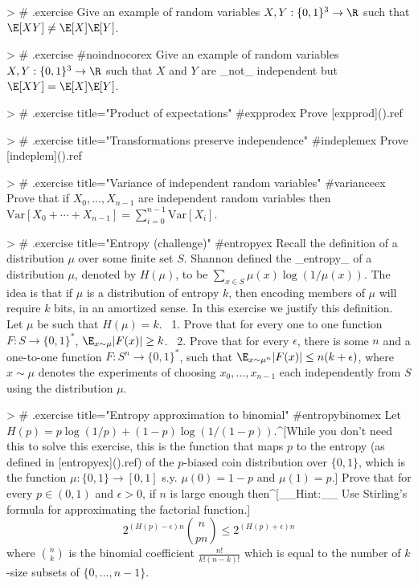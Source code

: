 > # {.exercise }
Give an example of random variables $X,Y: \{0,1\}^3 \rightarrow \R$ such that
$\E[XY] \neq \E[X]\E[Y]$.


> # {.exercise #noindnocorex }
Give an example of random variables $X,Y: \{0,1\}^3 \rightarrow \R$ such that $X$ and $Y$ are _not_ independent but $\E[XY] =\E[X]\E[Y]$.



> # {.exercise title="Product of expectations" #expprodex}
Prove [expprod](){.ref}

> # {.exercise title="Transformations preserve independence" #indeplemex}
Prove [indeplem](){.ref}


> # {.exercise title="Variance of independent random variables" #varianceex}
Prove that if $X_0,\ldots,X_{n-1}$ are independent random variables then $\mathrm{Var}[X_0+\cdots+X_{n-1}]=\sum_{i=0}^{n-1} \mathrm{Var}[X_i]$.


> # {.exercise title="Entropy (challenge)" #entropyex}
Recall the definition of a distribution $\mu$ over some finite set $S$.
Shannon defined the _entropy_ of a distribution $\mu$, denoted by $H(\mu)$, to be $\sum_{x\in S} \mu(x)\log(1/\mu(x))$.
The idea is that if $\mu$ is a distribution of entropy $k$, then encoding members of $\mu$ will require $k$ bits, in an amortized sense.
In this exercise we justify this definition. Let  $\mu$ be such that $H(\mu)=k$. \
1. Prove that for every one to one function $F:S \rightarrow \{0,1\}^*$, $\E_{x \sim \mu} |F(x)| \geq k$. \
2. Prove that  for every $\epsilon$, there is some $n$ and a one-to-one function $F:S^n \rightarrow \{0,1\}^*$, such that $\E_{x\sim \mu^n} |F(x)| \leq n(k+\epsilon)$,
where $x \sim \mu$ denotes the experiments of choosing $x_0,\ldots,x_{n-1}$ each independently from $S$ using the distribution $\mu$.

> # {.exercise title="Entropy approximation to binomial" #entropybinomex}
Let $H(p) = p \log(1/p)+(1-p)\log(1/(1-p))$.^[While you don't need this to solve this exercise, this is the function that maps $p$ to the entropy (as defined in [entropyex](){.ref}) of the $p$-biased coin distribution over $\{0,1\}$, which is the function $\mu:\{0,1\}\rightarrow [0,1]$ s.y. $\mu(0)=1-p$ and $\mu(1)=p$.]
Prove that for every $p \in (0,1)$ and $\epsilon>0$, if $n$ is large enough then^[__Hint:__ Use Stirling's formula for approximating the factorial function.]
$$
2^{(H(p)-\epsilon)n }\binom{n}{pn} \leq 2^{(H(p)+\epsilon)n}
$$
where $\binom{n}{k}$ is the binomial coefficient $\tfrac{n!}{k!(n-k)!}$ which is equal to the number of $k$-size subsets of $\{0,\ldots,n-1\}$.


